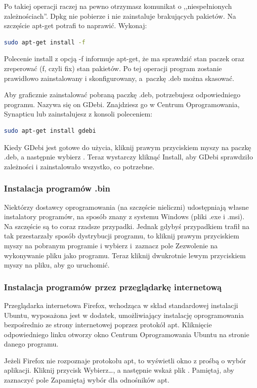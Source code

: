 Po takiej operacji raczej na pewno otrzymasz komunikat o ,,niespełnionych zależnościach''. Dpkg nie pobierze i nie zainstaluje brakujących pakietów. Na szczęście apt-get potrafi to naprawić. Wykonaj:
\begin{lstlisting}[language=bash]
sudo apt-get install -f
\end{lstlisting}

Polecenie \textcolor{ubuntu_orange}{install} z opcją \textcolor{ubuntu_orange}{-f} informuje apt-get, że ma sprawdzić stan paczek oraz zreperować (f, czyli fix) stan pakietów. Po tej operacji program zostanie prawidłowo zainstalowany i skonfigurowany, a~paczkę .deb można skasować.

Aby graficznie zainstalować pobraną paczkę .deb, potrzebujesz odpowiedniego programu. Nazywa się on \textcolor{ubuntu_orange}{GDebi}. Znajdziesz go w Centrum Oprogramowania, Synapticu lub zainstalujesz z konsoli poleceniem:
\begin{lstlisting}[language=bash]
sudo apt-get install gdebi
\end{lstlisting}

Kiedy GDebi jest gotowe do użycia, kliknij prawym przyciskiem myszy na paczkę .deb, a następnie wybierz . Teraz wystarczy kliknąć \textcolor{ubuntu_orange}{Install}, aby GDebi sprawdziło zależności i zainstalowało wszystko, co potrzebne.

\subsubsection{Instalacja programów .bin}
Niektórzy dostawcy oprogramowania (na szczęście nieliczni) udostępniają własne instalatory programów, na sposób znany z systemu Windows (pliki .exe i .msi). Na szczęście są to coraz rzadsze przypadki. Jednak gdybyś przypadkiem trafił na tak przestarzały sposób dystrybucji programu, to kliknij prawym przyciskiem myszy na pobranym programie i wybierz  i~zaznacz pole \textcolor{ubuntu_orange}{Zezwolenie na wykonywanie pliku jako programu}. Teraz kliknij dwukrotnie lewym przyciskiem myszy na pliku, aby go uruchomić.

\subsubsection{Instalacja programów przez przeglądarkę internetową}
Przeglądarka internetowa Firefox, wchodząca w skład standardowej instalacji Ubuntu, wyposażona jest w dodatek, umożliwiający instalację oprogramowania bezpośrednio ze strony internetowej poprzez protokół apt. Kliknięcie odpowiedniego linku otworzy okno \textcolor{ubuntu_orange}{Centrum Oprogramowania Ubuntu} na stronie danego programu.

Jeżeli Firefox nie rozpoznaje protokołu apt, to wyświetli okno z prośbą o wybór aplikacji. Kliknij przycisk \textcolor{ubuntu_orange}{Wybierz\ldots}, a następnie wskaż plik . Pamiętaj, aby zaznaczyć pole \textcolor{ubuntu_orange}{Zapamiętaj wybór dla odnośników apt}.
\clearpage